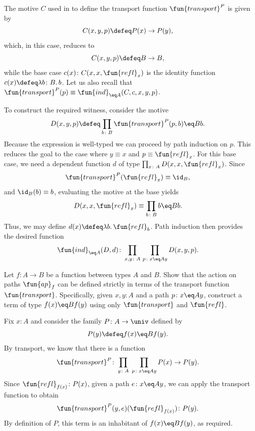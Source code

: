 \begin{solution}
    The motive $C$ used in  to define the transport function $\fun{transport}^P$ is given by
    \[
        C(x,y,p)\defeq P(x)\to P(y),
    \]
    which, in this case, reduces to
    \[
        C(x,y,p)\defeq B\to B,
    \]
    while the base case $c(x)\colon C(x,x,\fun{refl}_x)$ is the identity function $c(x)\defeq\lambda b\colon B.\,b$. Let us also recall that $\fun{transport}^P(p)\equiv\fun{ind}_{\eq A}(C,c,x,y,p)$.
    
    To construct the required witness, consider the motive
    \[
        D(x,y,p)\defeq\prod_{b\colon B}
            \fun{transport}^P(p,b)\eq Bb.
    \]
    Because the expression is well-typed we can proceed by path induction on $p$. This reduces the goal to the case where $y\equiv x$ and $p\equiv\fun{refl}_x$.
    For this base case, we need a dependent function $d$ of type $\prod_{x\colon A}D(x,x,\fun{refl}_x)$. Since
    \[
        \fun{transport}^P(\fun{refl}_x)\equiv\id_B,
    \]
    and $\id_B(b)\equiv b$, evaluating the motive at the base yields
    \[
        D(x,x,\fun{refl}_x)\equiv\prod_{b\colon B}b\eq Bb.
    \]
    Thus, we may define $d(x)\defeq\lambda b.\,\fun{refl}_b$. Path induction then provides the desired function
    \[
        \fun{ind}_{\eq A}(D,d)\colon
            \prod_{x,y\colon A}\,
            \prod_{p\colon x\eq Ay}
                D(x,y,p).
    \]
\end{solution}

\begin{exr}
    Let\/ $f\colon A\to B$ be a function between types\/ $A$ and\/ $B$.
    Show that the action on paths\/ $\fun{ap}_f$ can be defined strictly in terms of the transport function\/ $\fun{transport}$.
    Specifically, given\/ $x,y\colon A$ and a path\/ $p\colon x\eq Ay$, construct a term of type\/ $f(x)\eq Bf(y)$ using only\/ $\fun{transport}$ and\/ $\fun{refl}$.
\end{exr}

\begin{solution}
    Fix\/ $x\colon A$ and consider the family\/ $P\colon A\to\univ$ defined by
    \[
        P(y)\defeq f(x)\eq Bf(y).
    \]
    By transport, we know that there is a function
    \[
        \fun{transport}^P\colon\prod_{y\colon A}\;\prod_{p\colon x\eq Ay}P(x)\to P(y).
    \]
    Since\/ $\fun{refl}_{f(x)}\colon P(x)$, given a path\/ $e\colon x\eq A y$, we can apply the transport function to obtain
    \[
        \fun{transport}^P(y,e)(\fun{refl}_{f(x)})\colon P(y).
    \]
    By definition of\/ $P$, this term is an inhabitant of\/ $f(x)\eq B f(y)$, as required.
\end{solution}


